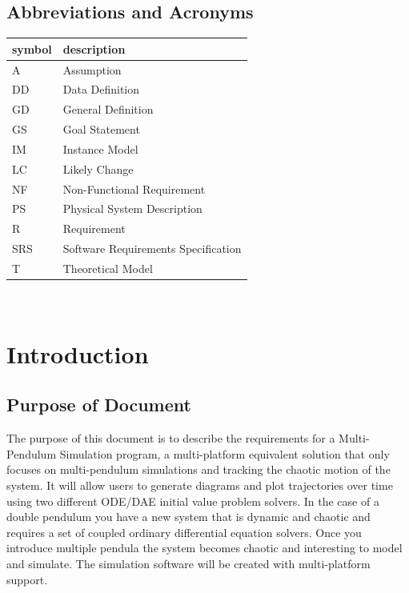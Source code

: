 \documentclass[12pt]{article}
\begin{document}
\subsection{Abbreviations and Acronyms}

\renewcommand{\arraystretch}{1.2}
\begin{tabular}{l l} 
  \toprule		
  \textbf{symbol} & \textbf{description}\\
  \midrule 
  A & Assumption\\
  DD & Data Definition\\
  GD & General Definition\\
  GS & Goal Statement\\
  IM & Instance Model\\
  LC & Likely Change\\
  NF & Non-Functional Requirement\\
  PS & Physical System Description\\
  R & Requirement\\
  SRS & Software Requirements Specification\\
  T & Theoretical Model\\
  \bottomrule
\end{tabular}\\

\newpage


\setcounter{secnumdepth}{3}

\section{Introduction}

\subsection{Purpose of Document}
The purpose of this document is to describe the requirements for a
Multi-Pendulum Simulation program, a  multi-platform equivalent solution that
only focuses on multi-pendulum simulations and tracking the chaotic motion of
the system. It will allow users to generate diagrams and plot trajectories over
time using two different ODE/DAE initial value problem solvers. In the case of 
a double pendulum you have a new system that is dynamic and chaotic and requires
a set of coupled ordinary differential equation solvers. Once you introduce multiple
pendula the system becomes chaotic and interesting to model and simulate. 
The simulation software will be created with multi-platform support.
\end{document}
